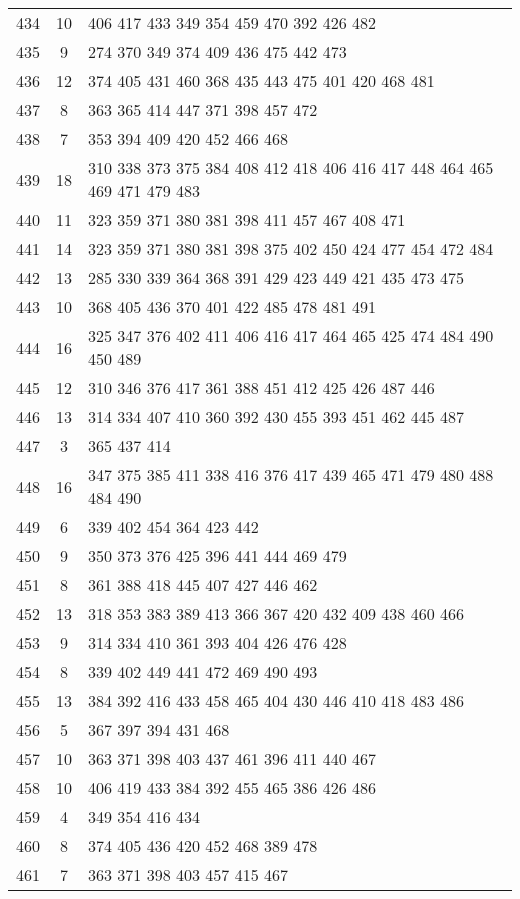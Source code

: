 \documentclass{standalone}
\begin{document}
\begin{tabular}{c c l}
434 & 10 & 406 417 433 349 354 459 470 392 426 482 \\
435 & 9 & 274 370 349 374 409 436 475 442 473 \\
436 & 12 & 374 405 431 460 368 435 443 475 401 420 468 481 \\
437 & 8 & 363 365 414 447 371 398 457 472 \\
438 & 7 & 353 394 409 420 452 466 468 \\
439 & 18 & 310 338 373 375 384 408 412 418 406 416 417 448 464 465 469 471 479 483 \\
440 & 11 & 323 359 371 380 381 398 411 457 467 408 471 \\
441 & 14 & 323 359 371 380 381 398 375 402 450 424 477 454 472 484 \\
442 & 13 & 285 330 339 364 368 391 429 423 449 421 435 473 475 \\
443 & 10 & 368 405 436 370 401 422 485 478 481 491 \\
444 & 16 & 325 347 376 402 411 406 416 417 464 465 425 474 484 490 450 489 \\
445 & 12 & 310 346 376 417 361 388 451 412 425 426 487 446 \\
446 & 13 & 314 334 407 410 360 392 430 455 393 451 462 445 487 \\
447 & 3 & 365 437 414 \\
448 & 16 & 347 375 385 411 338 416 376 417 439 465 471 479 480 488 484 490 \\
449 & 6 & 339 402 454 364 423 442 \\
450 & 9 & 350 373 376 425 396 441 444 469 479 \\
451 & 8 & 361 388 418 445 407 427 446 462 \\
452 & 13 & 318 353 383 389 413 366 367 420 432 409 438 460 466 \\
453 & 9 & 314 334 410 361 393 404 426 476 428 \\
454 & 8 & 339 402 449 441 472 469 490 493 \\
455 & 13 & 384 392 416 433 458 465 404 430 446 410 418 483 486 \\
456 & 5 & 367 397 394 431 468 \\
457 & 10 & 363 371 398 403 437 461 396 411 440 467 \\
458 & 10 & 406 419 433 384 392 455 465 386 426 486 \\
459 & 4 & 349 354 416 434 \\
460 & 8 & 374 405 436 420 452 468 389 478 \\
461 & 7 & 363 371 398 403 457 415 467 \\

\end{tabular}
\end{document}
